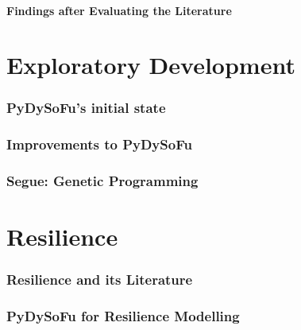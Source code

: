 \documentclass[draft]{article}
\begin{document}
\subsection{Findings after Evaluating the Literature}


\part{Exploratory Development}
\section{PyDySoFu's initial state}
\label{sec:pydysofu}







\section{Improvements to PyDySoFu}
\label{sec:pdsf_improvements}








\section{Segue: Genetic Programming}








\part{Resilience}
\section{Resilience and its Literature}
\label{sec:resilience}


\section{PyDySoFu for Resilience Modelling}
\end{document}
